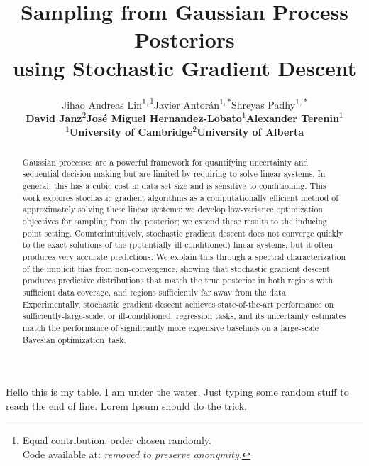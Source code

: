 \documentclass[hidelinks]{article}
\title{Sampling from Gaussian Process Posteriors\\using Stochastic Gradient Descent}
\author{Jihao Andreas Lin\textsuperscript{\ensuremath{1,}}\thanks{Equal contribution, order chosen randomly.\\Code available at: \emph{removed to preserve anonymity.}}\qquad Javier Antorán\textsuperscript{\ensuremath{1,*}}\qquad Shreyas Padhy\textsuperscript{\ensuremath{1,*}}\\\bfseries David Janz\textsuperscript{\ensuremath{2}}\qquad José Miguel Hernandez-Lobato\textsuperscript{\ensuremath{1}}\qquad Alexander Terenin\textsuperscript{\ensuremath{1}}\\\textsuperscript{\ensuremath{1}}University of Cambridge\qquad \textsuperscript{\ensuremath{2}}University of Alberta}
\begin{document}
\maketitle

\begin{abstract}
Gaussian processes are a powerful framework for quantifying uncertainty and sequential decision-making but are limited by requiring to solve linear systems. In general, this has a cubic cost in data set size and is sensitive to conditioning.
This work explores stochastic gradient algorithms as a computationally efficient method of approximately solving these linear systems: we develop low-variance optimization objectives for sampling from the posterior; we extend these results to the inducing point setting. 
Counterintuitively, stochastic gradient descent does not converge quickly to the exact solutions of the (potentially ill-conditioned) linear systems, but it often produces very accurate predictions.
We explain this through a spectral characterization of the implicit bias from non-convergence, showing that stochastic gradient descent produces predictive distributions that match the true posterior in both regions with sufficient data coverage, and regions sufficiently far away from the data.
Experimentally, stochastic gradient descent achieves state-of-the-art performance on sufficiently-large-scale, or ill-conditioned, regression tasks, and its uncertainty estimates match the performance of significantly more expensive baselines on a large-scale Bayesian optimization~task.
\end{abstract}

Hello this is my table. I am under the water.
Just typing some random stuff to reach the end of line.
Lorem Ipsum should do the trick.



\end{document}
